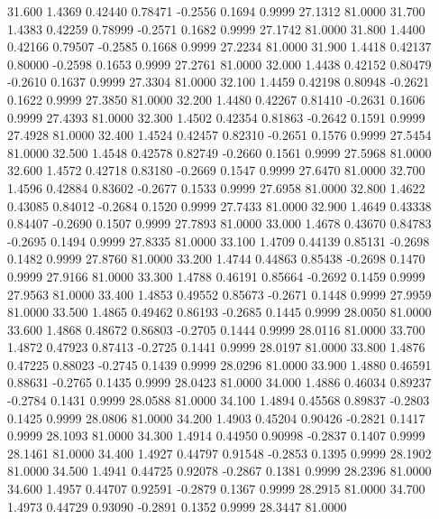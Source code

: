   31.600   1.4369   0.42440   0.78471  -0.2556   0.1694   0.9999  27.1312  81.0000
  31.700   1.4383   0.42259   0.78999  -0.2571   0.1682   0.9999  27.1742  81.0000
  31.800   1.4400   0.42166   0.79507  -0.2585   0.1668   0.9999  27.2234  81.0000
  31.900   1.4418   0.42137   0.80000  -0.2598   0.1653   0.9999  27.2761  81.0000
  32.000   1.4438   0.42152   0.80479  -0.2610   0.1637   0.9999  27.3304  81.0000
  32.100   1.4459   0.42198   0.80948  -0.2621   0.1622   0.9999  27.3850  81.0000
  32.200   1.4480   0.42267   0.81410  -0.2631   0.1606   0.9999  27.4393  81.0000
  32.300   1.4502   0.42354   0.81863  -0.2642   0.1591   0.9999  27.4928  81.0000
  32.400   1.4524   0.42457   0.82310  -0.2651   0.1576   0.9999  27.5454  81.0000
  32.500   1.4548   0.42578   0.82749  -0.2660   0.1561   0.9999  27.5968  81.0000
  32.600   1.4572   0.42718   0.83180  -0.2669   0.1547   0.9999  27.6470  81.0000
  32.700   1.4596   0.42884   0.83602  -0.2677   0.1533   0.9999  27.6958  81.0000
  32.800   1.4622   0.43085   0.84012  -0.2684   0.1520   0.9999  27.7433  81.0000
  32.900   1.4649   0.43338   0.84407  -0.2690   0.1507   0.9999  27.7893  81.0000
  33.000   1.4678   0.43670   0.84783  -0.2695   0.1494   0.9999  27.8335  81.0000
  33.100   1.4709   0.44139   0.85131  -0.2698   0.1482   0.9999  27.8760  81.0000
  33.200   1.4744   0.44863   0.85438  -0.2698   0.1470   0.9999  27.9166  81.0000
  33.300   1.4788   0.46191   0.85664  -0.2692   0.1459   0.9999  27.9563  81.0000
  33.400   1.4853   0.49552   0.85673  -0.2671   0.1448   0.9999  27.9959  81.0000
  33.500   1.4865   0.49462   0.86193  -0.2685   0.1445   0.9999  28.0050  81.0000
  33.600   1.4868   0.48672   0.86803  -0.2705   0.1444   0.9999  28.0116  81.0000
  33.700   1.4872   0.47923   0.87413  -0.2725   0.1441   0.9999  28.0197  81.0000
  33.800   1.4876   0.47225   0.88023  -0.2745   0.1439   0.9999  28.0296  81.0000
  33.900   1.4880   0.46591   0.88631  -0.2765   0.1435   0.9999  28.0423  81.0000
  34.000   1.4886   0.46034   0.89237  -0.2784   0.1431   0.9999  28.0588  81.0000
  34.100   1.4894   0.45568   0.89837  -0.2803   0.1425   0.9999  28.0806  81.0000
  34.200   1.4903   0.45204   0.90426  -0.2821   0.1417   0.9999  28.1093  81.0000
  34.300   1.4914   0.44950   0.90998  -0.2837   0.1407   0.9999  28.1461  81.0000
  34.400   1.4927   0.44797   0.91548  -0.2853   0.1395   0.9999  28.1902  81.0000
  34.500   1.4941   0.44725   0.92078  -0.2867   0.1381   0.9999  28.2396  81.0000
  34.600   1.4957   0.44707   0.92591  -0.2879   0.1367   0.9999  28.2915  81.0000
  34.700   1.4973   0.44729   0.93090  -0.2891   0.1352   0.9999  28.3447  81.0000
